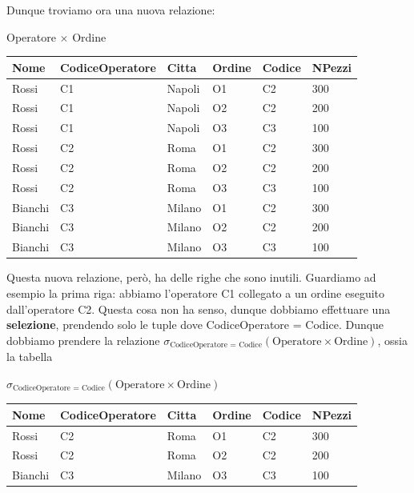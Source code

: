 \documentclass[11pt, a4paper, titlepage, oneside]{scrbook}
\begin{document}
Dunque troviamo ora una nuova relazione:

\begin{center}
    Operatore $\times$ Ordine

\begin{tabular}{|l|l|l|l|l|l|}
\hline
\textbf{Nome} & \textbf{CodiceOperatore} & \textbf{Citta} &\textbf{Ordine} & \textbf{Codice} & \textbf{NPezzi} \\ \hline
Rossi & C1 & Napoli & O1 & C2 & 300 \\
Rossi & C1 & Napoli & O2 & C2 & 200 \\
Rossi & C1 & Napoli & O3 & C3 & 100 \\ 
Rossi & C2 & Roma & O1 & C2 & 300 \\
Rossi & C2 & Roma & O2 & C2 & 200 \\
Rossi & C2 & Roma & O3 & C3 & 100 \\
Bianchi & C3 & Milano & O1 & C2 & 300 \\
Bianchi & C3 & Milano & O2 & C2 & 200 \\
Bianchi & C3 & Milano & O3 & C3 & 100 \\ \hline
\end{tabular}
\end{center}

Questa nuova relazione, però, ha delle righe che sono inutili. Guardiamo ad esempio la prima riga: abbiamo l'operatore C1 collegato a un ordine eseguito dall'operatore C2. Questa cosa non ha senso, dunque dobbiamo effettuare una \textbf{selezione}, prendendo solo le tuple dove CodiceOperatore = Codice. Dunque dobbiamo prendere la relazione $\sigma_{\text{CodiceOperatore = Codice}}(\text{Operatore} \times \text{Ordine})$, ossia la tabella


\begin{center}
 $\sigma_{\text{CodiceOperatore = Codice}}(\text{Operatore} \times \text{Ordine})$ \nopagebreak

\begin{tabular}{|l|l|l|l|l|l|}
\hline
\textbf{Nome} & \textbf{CodiceOperatore} & \textbf{Citta} &\textbf{Ordine} & \textbf{Codice} & \textbf{NPezzi} \\ \hline
Rossi & C2 & Roma & O1 & C2 & 300 \\
Rossi & C2 & Roma & O2 & C2 & 200 \\
Bianchi & C3 & Milano & O3 & C3 & 100 \\ \hline
\end{tabular}
\end{center}
\end{document}
